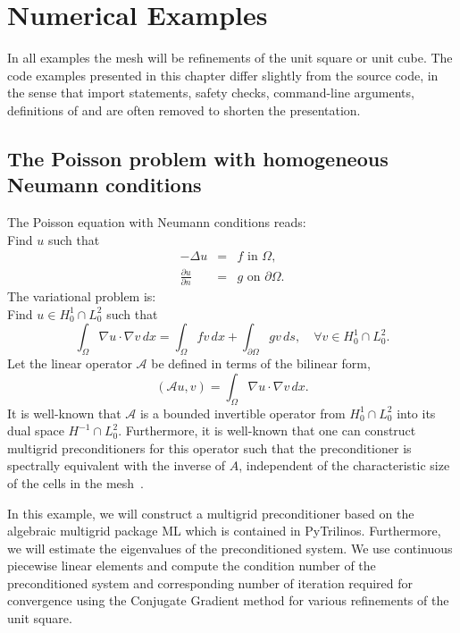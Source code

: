 \section{Numerical Examples}
In all examples the mesh will be refinements of the unit square or unit cube. 
The code examples presented in this chapter differ slightly from the source
code, in the sense that import statements,  safety checks, command-line arguments, definitions of 
and  are often removed to shorten the presentation. 


\subsection{The Poisson problem with homogeneous Neumann conditions}
The Poisson equation with Neumann conditions reads: \\ 
Find $u$ such that
\begin{eqnarray*}
-\Delta u &= &f \mbox{ in } \Omega,  \\ 
    \frac{\partial u}{\partial n} &=&  g \mbox{ on } \partial \Omega . 
\end{eqnarray*}
The variational problem is: \\ 
Find $u\in H^1_0 \cap L^2_0$ such that 
\[
\int_\Omega \nabla u \cdot \nabla v \, dx = \int_\Omega f v \, dx + \int_{\partial \Omega} g v \, ds, \quad \forall v \in H^1_0 \cap L^2_0 .      
\]
Let the linear operator $\mathcal{A}$ be defined in terms of the  bilinear form,  
\[
(\mathcal{A} u, v) =  \int_\Omega \nabla u \cdot \nabla v \, dx.  
\]
It is well-known that 
$\mathcal{A}$ is a bounded invertible operator from $H^1_0 \cap L^2_0$ into its dual space $H^{-1}\cap L^2_0$. 
Furthermore, it is well-known that one can construct multigrid preconditioners for this operator
such that the preconditioner is spectrally equivalent with the inverse of $A$, independent of the
characteristic size of the cells in the mesh~\cite{JHBramble_1993a,Hackbusch, TOS2001}. 

In this example, we will construct a multigrid preconditioner based on the algebraic multigrid
package ML which is contained in PyTrilinos. Furthermore, we will estimate the eigenvalues
of the preconditioned system. We use continuous piecewise linear elements and
compute the condition number of the preconditioned system and corresponding 
number of iteration required for convergence using the Conjugate Gradient method for various refinements of the unit square. 


